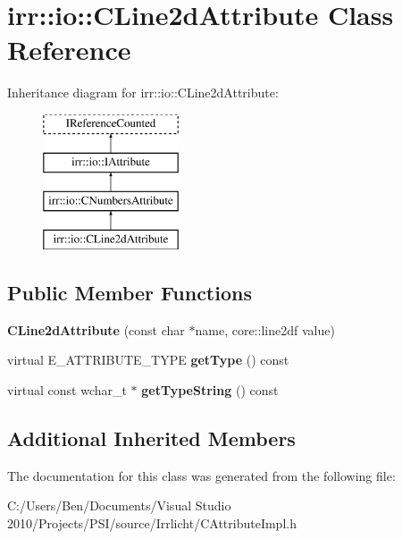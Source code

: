 \hypertarget{classirr_1_1io_1_1_c_line2d_attribute}{\section{irr\-:\-:io\-:\-:C\-Line2d\-Attribute Class Reference}
\label{classirr_1_1io_1_1_c_line2d_attribute}
}
Inheritance diagram for irr\-:\-:io\-:\-:C\-Line2d\-Attribute\-:\begin{figure}[H]
\begin{center}
\leavevmode
\includegraphics[height=4.000000cm]{classirr_1_1io_1_1_c_line2d_attribute}
\end{center}
\end{figure}
\subsection*{Public Member Functions}
\begin{DoxyCompactItemize}
\item 
\hypertarget{classirr_1_1io_1_1_c_line2d_attribute_a701f45732b12776c9aeb38ec3e900ca7}{{\bfseries C\-Line2d\-Attribute} (const char $\ast$name, core\-::line2df value)}\label{classirr_1_1io_1_1_c_line2d_attribute_a701f45732b12776c9aeb38ec3e900ca7}

\item 
\hypertarget{classirr_1_1io_1_1_c_line2d_attribute_a8d6a79b7be8a489816c13fcd58e20e59}{virtual E\-\_\-\-A\-T\-T\-R\-I\-B\-U\-T\-E\-\_\-\-T\-Y\-P\-E {\bfseries get\-Type} () const }\label{classirr_1_1io_1_1_c_line2d_attribute_a8d6a79b7be8a489816c13fcd58e20e59}

\item 
\hypertarget{classirr_1_1io_1_1_c_line2d_attribute_aff83c123376543c68bb3c1da7a165b6a}{virtual const wchar\-\_\-t $\ast$ {\bfseries get\-Type\-String} () const }\label{classirr_1_1io_1_1_c_line2d_attribute_aff83c123376543c68bb3c1da7a165b6a}

\end{DoxyCompactItemize}
\subsection*{Additional Inherited Members}


The documentation for this class was generated from the following file\-:\begin{DoxyCompactItemize}
\item 
C\-:/\-Users/\-Ben/\-Documents/\-Visual Studio 2010/\-Projects/\-P\-S\-I/source/\-Irrlicht/C\-Attribute\-Impl.\-h\end{DoxyCompactItemize}
